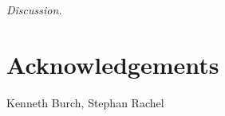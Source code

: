 \documentclass[reprint,amsmath,amssymb,aps,prl,groupedaddress,nofootinbib,superscriptaddress]{revtex4-1}
\newcommand{\1}{\mathds{1}}
\begin{document}
{\it Discussion.}







 




\section*{Acknowledgements}
Kenneth Burch, Stephan Rachel



%
\end{document}
